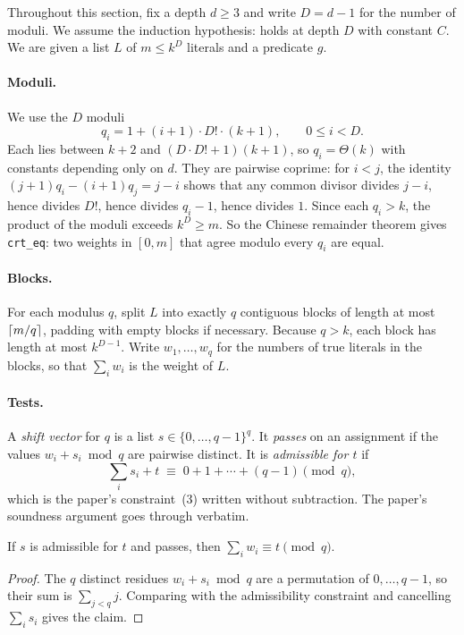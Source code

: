\documentclass[11pt]{article}
\newcommand{\isa}[1]{\texttt{#1}}
\begin{document}
Throughout this section, fix a depth $d \ge 3$ and write $D = d - 1$ for the number of moduli. We assume the induction hypothesis:  holds at depth $D$ with constant $C$. We are given a list $L$ of $m \le k^{D}$ literals and a predicate $g$.

\paragraph{Moduli.} We use the $D$ moduli
\[ q_i = 1 + (i+1)\cdot D! \cdot (k+1), \qquad 0 \le i < D. \]
Each lies between $k+2$ and $(D \cdot D! + 1)(k+1)$, so $q_i = \Theta(k)$ with constants depending only on $d$. They are pairwise coprime: for $i < j$, the identity $(j+1)q_i - (i+1)q_j = j - i$ shows that any common divisor divides $j - i$, hence divides $D!$, hence divides $q_i - 1$, hence divides $1$. Since each $q_i > k$, the product of the moduli exceeds $k^D \ge m$. So the Chinese remainder theorem gives \isa{crt\_eq}: two weights in $[0, m]$ that agree modulo every $q_i$ are equal.

\paragraph{Blocks.} For each modulus $q$, split $L$ into exactly $q$ contiguous blocks of length at most $\lceil m/q\rceil$, padding with empty blocks if necessary. Because $q > k$, each block has length at most $k^{D-1}$. Write $w_1, \dots, w_q$ for the numbers of true literals in the blocks, so that $\sum_i w_i$ is the weight of $L$.

\paragraph{Tests.} A \emph{shift vector} for $q$ is a list $s \in \{0, \dots, q-1\}^q$. It \emph{passes} on an assignment if the values $w_i + s_i \bmod q$ are pairwise distinct. It is \emph{admissible for $t$} if
\[ \textstyle\sum_i s_i + t \;\equiv\; 0 + 1 + \cdots + (q-1) \pmod q, \]
which is the paper's constraint~(3) written without subtraction. The paper's soundness argument goes through verbatim.

\begin{lemma}[\isa{test\_sound}]
If $s$ is admissible for $t$ and passes, then $\sum_i w_i \equiv t \pmod q$.
\end{lemma}

\begin{proof}
The $q$ distinct residues $w_i + s_i \bmod q$ are a permutation of $0, \dots, q-1$, so their sum is $\sum_{j<q} j$. Comparing with the admissibility constraint and cancelling $\sum_i s_i$ gives the claim.
\end{proof}
\end{document}
